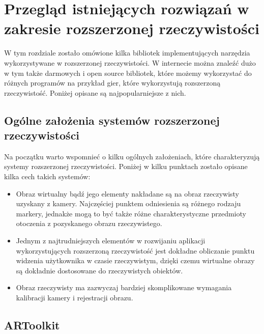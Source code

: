 \chapter{Przegląd istniejących rozwiązań w zakresie rozszerzonej rzeczywistości}
\label{cha:przegladIstniejacychRozwiazanWZakresieRozszerzonejRzeczywistosci}

W tym rozdziale zostało omówione kilka bibliotek implementujących narzędzia wykorzystywane w rozszerzonej rzeczywistości. W internecie można znaleźć dużo w tym także darmowych i open source bibliotek, które możemy wykorzystać do różnych programów na przykład gier, które wykorzystują rozszerzoną rzeczywistość. Poniżej opisane są najpopularniejsze z nich.


\section{Ogólne założenia systemów rozszerzonej rzeczywistości}
\label{sec:ogolneZalozeniaSystemowRozszerzonejRzeczywistosci}

Na początku warto wspomnieć o kilku ogólnych założeniach, które charakteryzują systemy rozszerzonej rzeczywistości. Poniżej w kilku punktach zostało opisane kilka cech takich systemów:
\begin{itemize}
	\item Obraz wirtualny bądź jego elementy nakładane są na obraz rzeczywisty uzyskany z kamery. Najczęściej punktem odniesienia są różnego rodzaju markery, jednakże mogą to być także różne charakterystyczne przedmioty otoczenia z pozyskanego obrazu rzeczywistego.
	\item Jednym z najtrudniejszych elementów w rozwijaniu aplikacji wykorzystujących rozszerzoną rzeczywistość jest dokładne obliczanie punktu widzenia użytkownika w czasie rzeczywistym, dzięki czemu wirtualne obrazy są dokładnie dostosowane do rzeczywistych obiektów.
	\item Obraz rzeczywisty ma zazwyczaj bardziej skomplikowane wymagania kalibracji kamery i rejestracji obrazu.
\end{itemize}


\section{ARToolkit}
\label{sec:artoolkit}

